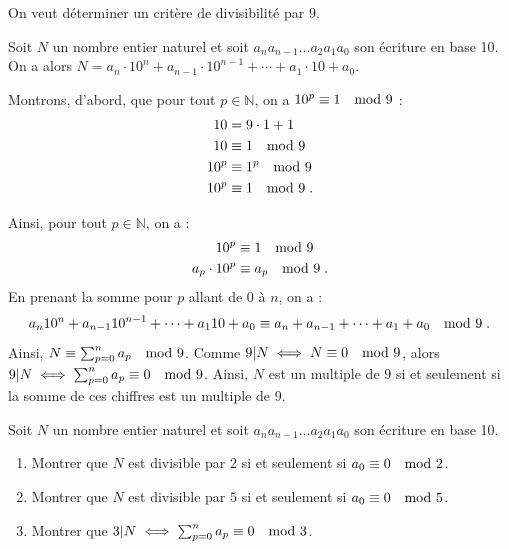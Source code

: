       \begin{ex}
            On veut d\'eterminer un crit\`ere de divisibilit\'e par $9$.
            
            Soit $N$ un nombre entier naturel et soit $a_n a_{n-1} \ldots a_2 a_1 a_0$ son \'ecriture en base 10.
            On a alors $N = a_n \cdot 10^n + a_{n-1} \cdot 10^{n-1} + \cdots + a_1 \cdot 10 + a_0$.
            
            Montrons, d'abord, que pour tout $p\in\mathbb{N}$, on a $10^p \equiv 1 \quad \mathrm{mod}\ 9$ :
                  \begin{align*}
                        10 & = 9 \cdot 1 + 1     \\
                        10 &  \equiv 1 \quad \mathrm{mod}\ 9     \\
                        10^p &  \equiv 1^p \quad \mathrm{mod}\ 9 \\
                        10^p &  \equiv 1 \quad \mathrm{mod}\ 9   \;.
                  \end{align*}
                  
            Ainsi, pour tout $p\in\mathbb{N}$, on a :
                  \begin{align*}
                        10^p &  \equiv 1 \quad \mathrm{mod}\ 9                   \\
                        a_p \cdot 10^p &  \equiv a_p \quad \mathrm{mod}\ 9       \;.
                  \end{align*}
            En prenant la somme pour $p$ allant de $0$ \`a $n$, on a :
                  \begin{align*}
                        a_n10^n+a_{n-1}10^{n-1}+\cdots+a_110+a_0 \equiv a_n+a_{n-1}+\cdots+a_1+a_0 \quad \mathrm{mod}\ 9      \;.
                  \end{align*}
            Ainsi, $N \equiv \sum_{p=0}^n a_p \quad \mathrm{mod}\ 9$.
            Comme $9|N \iff N \equiv 0 \quad \mathrm{mod}\ 9$, alors $9|N \iff \sum_{p=0}^n a_p \equiv 0 \quad \mathrm{mod}\ 9$.
            Ainsi, $N$ est un multiple de $9$ si et seulement si la somme de ces chiffres est un multiple de $9$.
      \end{ex}
      \begin{exe}
            Soit $N$ un nombre entier naturel et soit $a_n a_{n-1} \ldots a_2 a_1 a_0$ son \'ecriture en base 10.
            \begin{enumerate}
                  \item Montrer que $N$ est divisible par $2$ si et seulement si $a_0 \equiv 0 \quad \mathrm{mod}\ 2$.
                  \item Montrer que $N$ est divisible par $5$ si et seulement si $a_0 \equiv 0 \quad \mathrm{mod}\ 5$.
                  \item Montrer que $3|N \iff \sum_{p=0}^n a_p \equiv 0 \quad \mathrm{mod}\ 3$.
            \end{enumerate}
      \end{exe}
